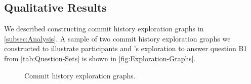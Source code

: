 \subsection{Qualitative Results}

We described constructing commit history exploration graphs in \autoref{subsec:Analysis}. 
A sample of two commit history exploration graphs we constructed to illustrate participants  and ’s exploration to answer question B1 from \autoref{tab:Question-Sets} is shown in \autoref{fig:Exploration-Graphs}.

\begin{figure}[h]
  \centering%
  \qquad
  \caption{
    Commit history exploration graphs.
  }%
  \label{fig:Exploration-Graphs}%
\end{figure}

